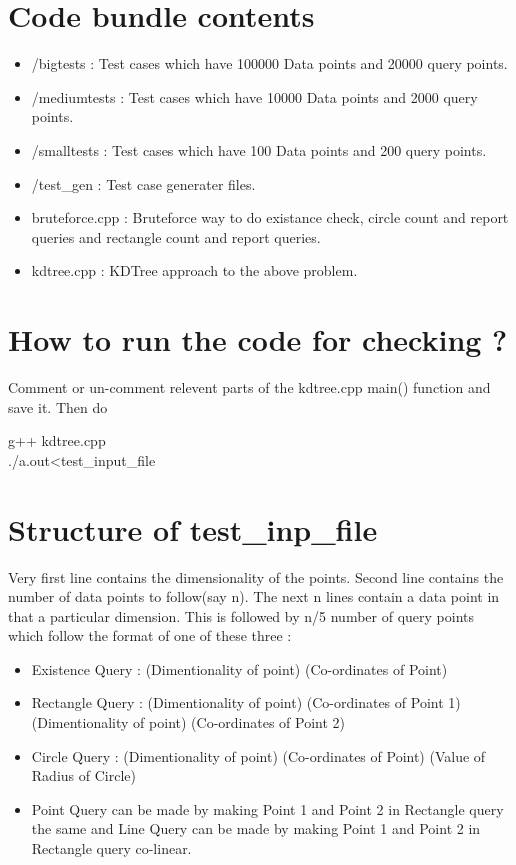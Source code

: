 \documentclass[11pt]{article}
\begin{document}
\section{Code bundle contents}

\begin{itemize}
	\item /bigtests : Test cases which have 100000 Data points and 20000 query points.
	\item /mediumtests : Test cases which have 10000 Data points and 2000 query points.
	\item /smalltests : Test cases which have 100 Data points and 200 query points.
	\item /test\_gen : Test case generater files.
	\item bruteforce.cpp : Bruteforce way to do existance check, circle count and report queries and rectangle count and report queries.
	\item kdtree.cpp : KDTree approach to the above problem.
\end{itemize}

\section{How to run the code for checking ?}
Comment or un-comment relevent parts of the kdtree.cpp main() function and save it. Then do
\begin{center}g++ kdtree.cpp\\
./a.out\textless test\_input\_file\end{center}

\section{Structure of test\_inp\_file}
Very first line contains the dimensionality of the points. Second line contains the number of data points to follow(say n). The next n lines contain a data point in that a particular dimension. This is followed by n/5 number of query points which follow the format of one of these three : 
	\begin{itemize}
  		\item Existence Query : (Dimentionality of point) (Co-ordinates of Point)
  		\item Rectangle Query : (Dimentionality of point) (Co-ordinates of Point 1) (Dimentionality of point) (Co-ordinates of Point 2)
  		\item Circle Query : (Dimentionality of point) (Co-ordinates of Point) (Value of Radius of Circle)
  		\item Point Query can be made by making Point 1 and Point 2 in Rectangle query the same and Line Query can be made by making Point 1 and Point 2 in Rectangle query co-linear.
	\end{itemize}
\end{document}
